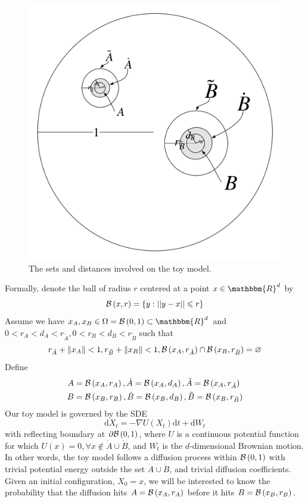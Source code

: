 \documentclass[english, aip, jcp, priprint, graphicx]{revtex4-1}
\theoremstyle{plain}
\theoremstyle{definition}
\theoremstyle{plain}
\begin{document}
\begin{figure}
\includegraphics[width=.5\textheight]{figs/golfpic}
\caption{\label{fig:golfsets} The sets and distances involved on the toy model.}
\end{figure}

Formally, denote the ball of radius $r$ centered at a point $x \in \mathbbm{R}^d$ by 
\begin{equation*}
\mathcal{B}\left(x, r\right) = \{ y : || y - x || \leqslant r \}
\end{equation*}
Assume we have $x_A , x_B \in \Omega=\bb{0, 1} \subset \mathbbm{R}^d$ and $0 < r_A < d_A < r_{\tilde{A}}, 0 < r_B < d_B < r_{\tilde{B}}$ such that
\begin{equation*}
r_{\tilde{A}} + \| x_A \| < 1, r_{\tilde{B}} + \| x_B \| < 1, \mathcal{B}\left(x_A, r_{\tilde{A}}\right) \cap \mathcal{B}\left(x_B, r_{\tilde{B}}\right) = \varnothing
\end{equation*}
Define
\begin{align*}
A &= \mathcal{B}\left(x_A, r_A\right), \dot{A} = \mathcal{B}\left(x_A, d_A\right), \tilde{A} = \mathcal{B}\left(x_A, r_{\tilde{A}}\right)\\
B &= \mathcal{B}\left(x_B, r_B\right), \dot{B} = \mathcal{B}\left(x_B, d_B\right), \tilde{B} = \mathcal{B}\left(x_B, r_{\tilde{B}}\right) 
\end{align*}
Our toy model is governed by the SDE
\begin{equation} \label{equ:toy_sde}
\mathrm{d} X_t = - \nabla U (X_t) \mathrm{d} t + \mathrm{d} W_t 
\end{equation}
with reflecting boundary at $\partial \mathcal{B}\left(0, 1\right)$, where $U$ is a continuous potential function for which $U (x) = 0, \forall x \not\in \dot{A} \cup \dot{B}$, and $W_t$ is the $d$-dimensional Brownian motion. In other words, the toy model follows a diffusion process within $\mathcal{B}\left(0, 1\right)$ with trivial potential energy outside the set $\dot{A} \cup \dot{B}$, and trivial diffusion coefficients. Given an initial configuration, $X_0 = x$, we will be interested to know the probability that the diffusion hits $A=\mathcal{B}\left(x_A,r_A\right)$ before it hits $B=\mathcal{B}\left(x_B, r_B\right)$.
\end{document}
